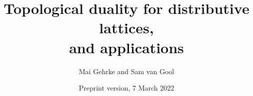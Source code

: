 \title{Topological duality for distributive lattices, \\ and applications} 
\author{Mai Gehrke and Sam van Gool}
\date{Preprint version, 7 March 2022} 
\maketitle